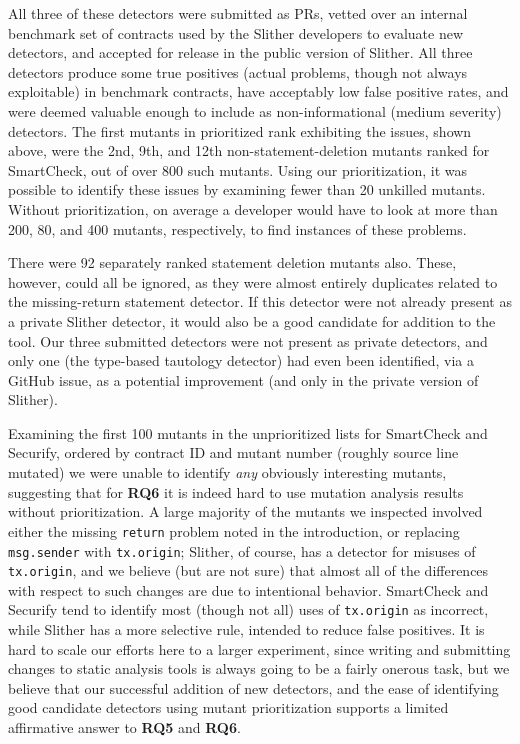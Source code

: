 All three of these detectors were submitted as PRs, vetted over an internal benchmark set of contracts used by the Slither developers to evaluate new detectors, and accepted for release in the public version of Slither.  All three detectors produce some true positives (actual problems, though not always exploitable) in benchmark contracts, have acceptably low false positive rates, and were deemed valuable enough to include as non-informational (medium severity) detectors.  The first mutants in prioritized rank exhibiting the issues, shown above, were the 2nd, 9th, and 12th non-statement-deletion mutants ranked for SmartCheck, out of over 800 such mutants.  Using our prioritization, it was possible to identify these issues by examining fewer than 20 unkilled mutants.  Without prioritization, on average a developer would have to look at more than 200, 80, and 400 mutants, respectively, to find instances of these problems.  

There were 92 separately ranked statement deletion mutants also.  These, however, could all be ignored, as they were almost entirely duplicates related to the missing-return statement detector.  If this detector were not already present as a private Slither detector, it would also be a good candidate for addition to the tool.  Our three submitted detectors were not present as private detectors, and only one (the type-based tautology detector) had even been identified, via a GitHub issue, as a potential improvement (and only in the private version of Slither).  

Examining the first 100 mutants in the unprioritized lists for SmartCheck and Securify, ordered by contract ID and mutant number (roughly source line mutated) we were unable to identify \emph{any} obviously interesting mutants, suggesting that for {\bf RQ6} it is indeed hard to use mutation analysis results without prioritization. A large majority of the mutants we inspected involved either the missing
{\tt return} problem noted in the introduction, or replacing {\tt msg.sender} with {\tt tx.origin}; Slither, of course, has a detector for misuses of {\tt tx.origin}, and we believe (but are not sure) that almost all of the differences with respect to such changes are due to intentional behavior. SmartCheck and Securify tend to identify most (though not all) uses of {\tt tx.origin} as incorrect, while Slither has a more selective rule, intended to reduce false positives.
It is hard to scale our efforts here to a larger experiment, since writing and submitting changes to static analysis tools is always going to be a fairly onerous task, but we believe that our successful addition of new detectors, and the ease of identifying good candidate detectors using mutant prioritization supports a limited affirmative answer to {\bf RQ5} and {\bf RQ6}.

